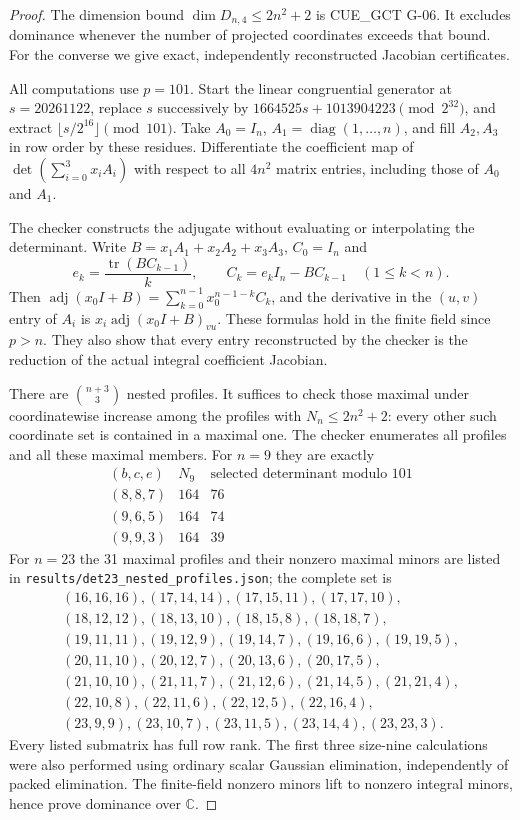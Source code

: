\begin{proof}
The dimension bound $\dim D_{n,4}\le 2n^2+2$ is CUE\_GCT G-06.
It excludes dominance whenever the number of projected coordinates
exceeds that bound. For the converse we give exact, independently
reconstructed Jacobian certificates.

All computations use $p=101$. Start the linear congruential generator at
$s=20261122$, replace $s$ successively by
$1664525s+1013904223\pmod{2^{32}}$, and extract
$\lfloor s/2^{16}\rfloor\pmod {101}$.
Take $A_0=I_n$, $A_1=\operatorname{diag}(1,\ldots,n)$, and fill
$A_2,A_3$ in row order by these residues. Differentiate the coefficient
map of $\det(\sum_{i=0}^3x_iA_i)$ with respect to all $4n^2$ matrix
entries, including those of $A_0$ and $A_1$.

The checker constructs the adjugate without evaluating or interpolating
the determinant. Write $B=x_1A_1+x_2A_2+x_3A_3$, $C_0=I_n$ and
\[
 e_k=\frac{\operatorname{tr}(BC_{k-1})}{k},\qquad
 C_k=e_kI_n-BC_{k-1}\quad(1\le k<n).
\]
Then
$\operatorname{adj}(x_0I+B)=\sum_{k=0}^{n-1}x_0^{n-1-k}C_k$,
and the derivative in the $(u,v)$ entry of $A_i$ is
$x_i\operatorname{adj}(x_0I+B)_{vu}$.
These formulas hold in the finite field since $p>n$.
They also show that every entry reconstructed by the checker is the
reduction of the actual integral coefficient Jacobian.

There are $\binom{n+3}{3}$ nested profiles. It suffices to check those
maximal under coordinatewise increase among the profiles with
$N_n\le2n^2+2$: every other such coordinate set is contained in a maximal
one. The checker enumerates all profiles and all these maximal members.
For $n=9$ they are exactly
\[
\begin{array}{c|r|r}
 (b,c,e)&N_9&\text{selected determinant modulo }101\\\hline
 (8,8,7)&164&76\\
 (9,6,5)&164&74\\
 (9,9,3)&164&39
\end{array}
\]
For $n=23$ the 31 maximal profiles and their nonzero maximal minors are
listed in \texttt{results/det23\_nested\_profiles.json}; the complete
set is
\[
\begin{gathered}
(16,16,16),(17,14,14),(17,15,11),(17,17,10),\\
(18,12,12),(18,13,10),(18,15,8),(18,18,7),\\
(19,11,11),(19,12,9),(19,14,7),(19,16,6),(19,19,5),\\
(20,11,10),(20,12,7),(20,13,6),(20,17,5),\\
(21,10,10),(21,11,7),(21,12,6),(21,14,5),(21,21,4),\\
(22,10,8),(22,11,6),(22,12,5),(22,16,4),\\
(23,9,9),(23,10,7),(23,11,5),(23,14,4),(23,23,3).
\end{gathered}
\]
Every listed submatrix has full row rank. The first three size-nine
calculations were also performed using ordinary scalar Gaussian
elimination, independently of packed elimination. The finite-field
nonzero minors lift to nonzero integral minors, hence prove dominance
over $\mathbb C$.


\end{proof}
